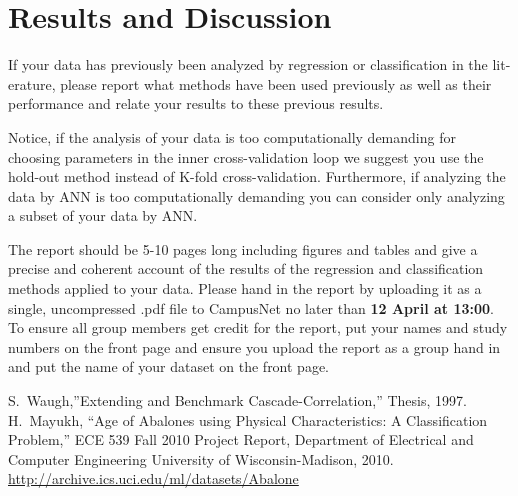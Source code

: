 \documentclass[10pt, paper=a4]{article}
\begin{document}
\section{Results and Discussion}
\label{sec:results_and_discussion}
If your data has previously been analyzed by regression or
classification in the lit- erature, please report what methods have
been used previously as well as their performance and relate your
results to these previous results.

Notice, if the analysis of your data is too computationally demanding
for choosing parameters in the inner cross-validation loop we suggest
you use the hold-out method instead of K-fold
cross-validation. Furthermore, if analyzing the data by ANN is too
computationally demanding you can consider only analyzing a subset of
your data by ANN.

The report should be 5-10 pages long including figures and tables and
give a precise and coherent account of the results of the regression
and classification methods applied to your data. Please hand in the
report by uploading it as a single, uncompressed .pdf file to
CampusNet no later than {\bf 12 April at 13:00}.  To ensure all group
members get credit for the report, put your names and study numbers on
the front page and ensure you upload the report as a group hand in and
put the name of your dataset on the front page.
\begin{thebibliography}{99}
	 S.~Waugh,''Extending and Benchmark
  	Cascade-Correlation,'' Thesis, 1997.
	 H.~Mayukh, ``Age of Abalones using Physical
    Characteristics: A Classification Problem,'' ECE 539 Fall 2010
    Project Report, Department of Electrical and Computer Engineering
    University of Wisconsin-Madison, 2010.
     \url{http://archive.ics.uci.edu/ml/datasets/Abalone}
    
\end{thebibliography}
\end{document}

